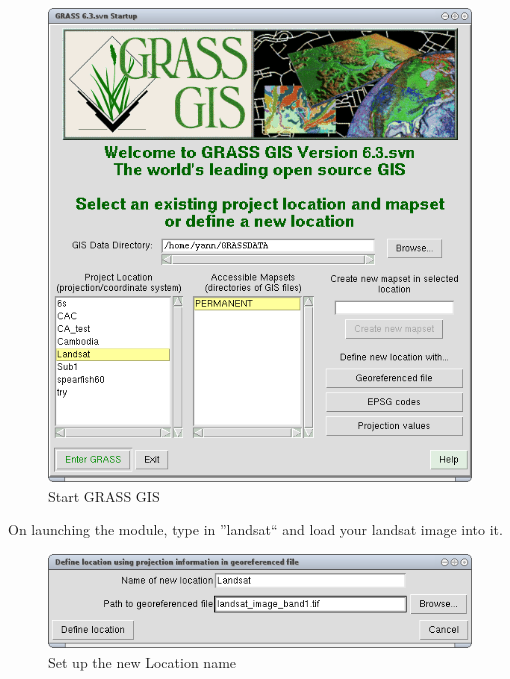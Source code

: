 \begin{figure}[htbp]
   \centering
   \includegraphics[scale=0.35]{grass_rs000.png}
   \caption{Start GRASS GIS}
   \label{fig:grass_rs000}
\end{figure}

On launching the module, type in ''landsat`` and load your landsat image into it.

\begin{figure}[htbp]
   \centering
   \includegraphics[scale=0.35]{grass_rs001.png}
   \caption{Set up the new Location name}
   \label{fig:grass_rs001}
\end{figure}

